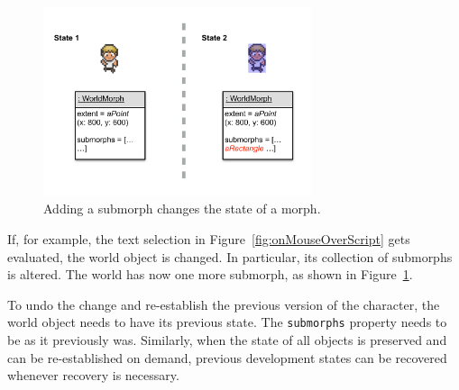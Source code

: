 \begin{figure}[h]
    \centering
    \includegraphics[width=0.7\textwidth]{figures/3_motivation/5_stateChanges.pdf}
    \caption{Adding a submorph changes the state of a morph.}
    \label{fig:changedCharacter}
\end{figure}

If, for example, the text selection in Figure~\ref{fig:onMouseOverScript} gets evaluated, the world object is changed.
In particular, its collection of submorphs is altered.
The world has now one more submorph, as shown in Figure~\ref{fig:changedCharacter}.

To undo the change and re-establish the previous version of the character, the world object needs to have its previous state.
The \lstinline{submorphs} property needs to be as it previously was.
Similarly, when the state of all objects is preserved and can be re-established on demand, previous development states can be recovered whenever recovery is necessary.
